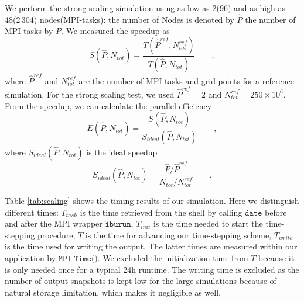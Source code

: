 \documentclass[10pt]{article}
\begin{document}
We perform the strong scaling simulation using as low as 2(96) and as high as 48(2$\,$304) nodes(MPI-tasks): the number of Nodes is denoted by $\hat P$ the number of MPI-tasks by $P$.  We measured the speedup as
%
\begin{equation}
S(\hat P,N_{tot})=\frac{T(\hat P^{ref},N^{ref}_{tot})}{T(\hat P,N_{tot})  } \qquad ,
\end{equation}
%
where $\hat P^{ref}$ and $N^{ref}_{tot}$ are the number of MPI-tasks and grid points for a reference simulation.  For the strong scaling test, we used $\hat P^{ref}=2$ and $N^{ref}_{tot}=250\times 10^6$.  From the speedup, we can calculate the parallel efficiency
%
\begin{equation}
E(\hat P,N_{tot})=\frac{S(\hat P,N_{tot})}{S_\mathit{ideal}(\hat P,N_{tot}) } \qquad ,
\end{equation}
%
where $S_\mathit{ideal}(\hat P,N_{tot})$ is the ideal speedup
%
\begin{equation}
S_\mathit{ideal}(\hat P,N_{tot})=\frac{\hat P/\hat P^{ref}}{N_{tot}/N^{ref}_{tot}} \qquad .
\end{equation}

Table \ref{tab:scaling} shows the timing results of our simulation. Here we distinguish different times: $T_{task}$ is the time retrieved from the shell by  calling $\texttt{date}$ before and after the MPI wrapper $\texttt{iburun}$, $T_{init}$ is the time needed to start the time-stepping procedure,  $T$ is the time for advancing our time-stepping scheme,  $T_{write}$ is the time used for writing the output. The latter times are measured within our application by $\texttt{MPI\_Time()}$.  We excluded the initialization time from $T$ because it is only needed once for a typical 24h runtime. The writing time is excluded as the number of output snapshots is kept low for the large simulations because of natural storage limitation, which makes it negligible as well.
\end{document}
